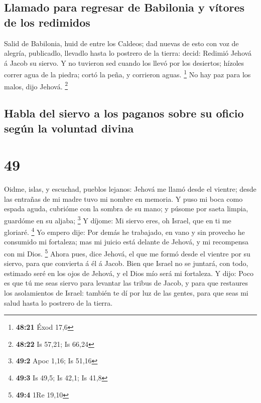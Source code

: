 \hypertarget{llamado-para-regresar-de-babilonia-y-vuxedtores-de-los-redimidos}{%
\subsection{Llamado para regresar de Babilonia y vítores de los
redimidos}\label{llamado-para-regresar-de-babilonia-y-vuxedtores-de-los-redimidos}}

 Salid de Babilonia, huid de entre los Caldeos; dad nuevas
de esto con voz de alegría, publicadlo, llevadlo hasta lo postrero de la
tierra: decid: Redimió Jehová á Jacob su siervo.  Y no
tuvieron sed cuando los llevó por los desiertos; hízoles correr agua de
la piedra; cortó la peña, y corrieron aguas. \footnote{\textbf{48:21}
  Éxod 17,6}  No hay paz para los malos, dijo Jehová.
\footnote{\textbf{48:22} Is 57,21; Is 66,24}

\hypertarget{habla-del-siervo-a-los-paganos-sobre-su-oficio-seguxfan-la-voluntad-divina}{%
\subsection{Habla del siervo a los paganos sobre su oficio según la
voluntad
divina}\label{habla-del-siervo-a-los-paganos-sobre-su-oficio-seguxfan-la-voluntad-divina}}

\hypertarget{section-48}{%
\section{49}\label{section-48}}

 Oidme, islas, y escuchad, pueblos lejanos: Jehová me llamó
desde el vientre; desde las entrañas de mi madre tuvo mi nombre en
memoria.  Y puso mi boca como espada aguda, cubrióme con la
sombra de su mano; y púsome por saeta limpia, guardóme en su aljaba;
\footnote{\textbf{49:2} Apoc 1,16; Is 51,16}  Y díjome: Mi
siervo eres, oh Israel, que en ti me gloriaré. \footnote{\textbf{49:3}
  Is 49,5; Is 42,1; Is 41,8}  Yo empero dije: Por demás he
trabajado, en vano y sin provecho he consumido mi fortaleza; mas mi
juicio está delante de Jehová, y mi recompensa con mi Dios. \footnote{\textbf{49:4}
  1Re 19,10}  Ahora pues, dice Jehová, el que me formó desde
el vientre por su siervo, para que convierta á él á Jacob. Bien que
Israel no se juntará, con todo, estimado seré en los ojos de Jehová, y
el Dios mío será mi fortaleza.  Y dijo: Poco es que tú me
seas siervo para levantar las tribus de Jacob, y para que restaures los
asolamientos de Israel: también te dí por luz de las gentes, para que
seas mi salud hasta lo postrero de la tierra.

